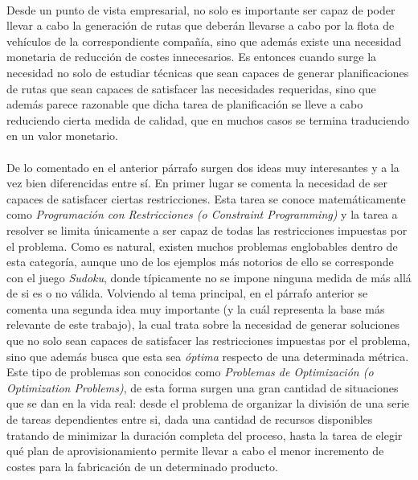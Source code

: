 \documentclass{subfiles}
\begin{document}
      \paragraph{}
      Desde un punto de vista empresarial, no solo es importante ser capaz de poder llevar a cabo la generación de rutas que deberán llevarse a cabo por la flota de vehículos de la correspondiente compañía, sino que además existe una necesidad monetaria de reducción de costes innecesarios. Es entonces cuando surge la necesidad no solo de estudiar técnicas que sean capaces de generar planificaciones de rutas que sean capaces de satisfacer las necesidades requeridas, sino que además parece razonable que dicha tarea de planificación se lleve a cabo reduciendo cierta medida de calidad, que en muchos casos se termina traduciendo en un valor monetario.

      \paragraph{}
      De lo comentado en el anterior párrafo surgen dos ideas muy interesantes y a la vez bien diferencidas entre sí. En primer lugar se comenta la necesidad de ser capaces de satisfacer ciertas restricciones. Esta tarea se conoce matemáticamente como \emph{Programación con Restricciones (o Constraint Programming)} y la tarea a resolver se limita únicamente a ser capaz de  todas las restricciones impuestas por el problema. Como es natural, existen muchos problemas englobables dentro de esta categoría, aunque uno de los ejemplos más notorios de ello se corresponde con el juego \emph{Sudoku}, donde típicamente no se impone ninguna medida de  más allá de si es o no válida. Volviendo al tema principal, en el párrafo anterior se comenta una segunda idea muy importante (y la cuál representa la base más relevante de este trabajo), la cual trata sobre la necesidad de generar soluciones que no solo sean capaces de satisfacer las restricciones impuestas por el problema, sino que además busca que esta sea \emph{óptima} respecto de una determinada métrica. Este tipo de problemas son conocidos como \emph{Problemas de Optimización (o Optimization Problems)}, de esta forma surgen una gran cantidad de situaciones que se dan en la vida real: desde el problema de organizar la división de una serie de tareas dependientes entre si, dada una cantidad de recursos disponibles tratando de minimizar la duración completa del proceso, hasta la tarea de elegir qué plan de aprovisionamiento permite llevar a cabo el menor incremento de costes para la fabricación de un determinado producto.
\end{document}
